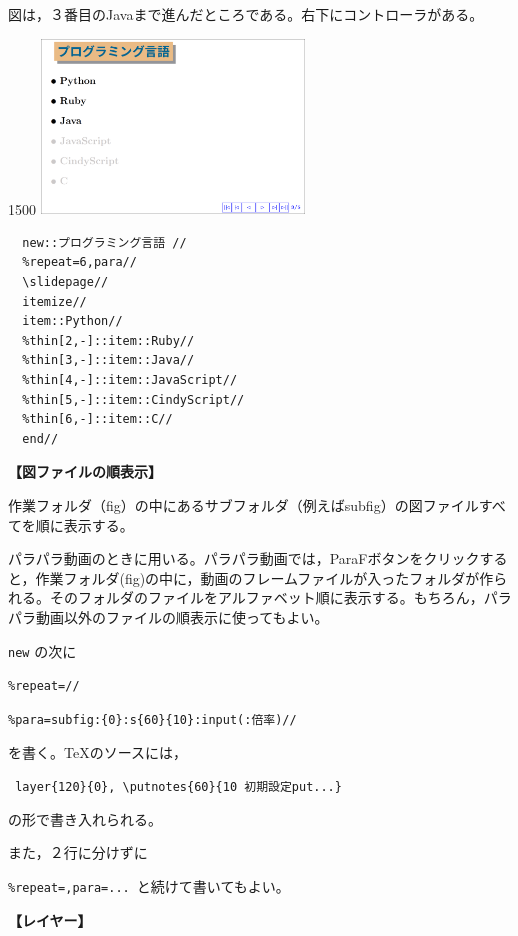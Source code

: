 \documentclass[papersize,a4paper,12pt,uplatex]{jsarticle}
\begin{document}
図は，３番目のJavaまで進んだところである。右下にコントローラがある。

\begin{layer}{150}{0}
 {\includegraphics[bb=0.00 0.00 777.04 516.03,width=7cm]{Fig/sliderepeat.pdf} }
\end{layer}
\begin{verbatim}
  new::プログラミング言語 //
  %repeat=6,para// 
  \slidepage// 
  itemize// 
  item::Python// 
  %thin[2,-]::item::Ruby// 
  %thin[3,-]::item::Java// 
  %thin[4,-]::item::JavaScript// 
  %thin[5,-]::item::CindyScript// 
  %thin[6,-]::item::C// 
  end// 
\end{verbatim}

\vspace{\baselineskip}
 {\bf 【図ファイルの順表示】}
 
作業フォルダ（fig）の中にあるサブフォルダ（例えばsubfig）の図ファイルすべてを順に表示する。

 パラパラ動画のときに用いる。パラパラ動画では，ParaFボタンをクリックすると，作業フォルダ(fig)の中に，動画のフレームファイルが入ったフォルダが作られる。そのフォルダのファイルをアルファベット順に表示する。もちろん，パラパラ動画以外のファイルの順表示に使ってもよい。

\verb|new| の次に
 
\hspace{10mm} \verb|%repeat=//|
 
\hspace{10mm} \verb|%para=subfig:{0}:s{60}{10}:input(:倍率)//|

を書く。TeXのソースには，
 
\hspace{10mm}\verb| layer{120}{0}, \putnotes{60}{10 初期設定put...}|

の形で書き入れられる。

また，２行に分けずに

\hspace{10mm} \verb|%repeat=,para=... |と続けて書いてもよい。
 

\vspace{\baselineskip}
{\bf 【レイヤー】}
\end{document}
